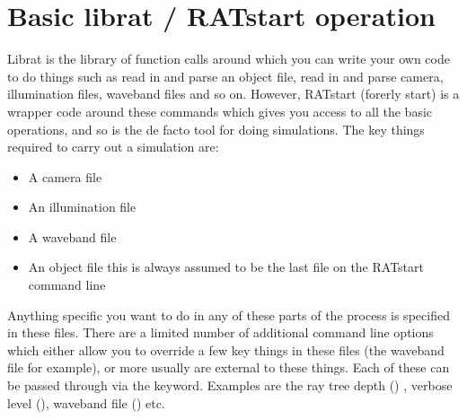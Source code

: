 \documentclass[letterpaper,10pt,english]{sphinxmanual}
\begin{document}
{
\begin{sphinxVerbatim}[commandchars=\\\{\}]
\llap{\color{nbsphinxin}[ ]:\,\hspace{\fboxrule}\hspace{\fboxsep}}
\end{sphinxVerbatim}
}

{
\begin{sphinxVerbatim}[commandchars=\\\{\}]
\llap{\color{nbsphinxin}[ ]:\,\hspace{\fboxrule}\hspace{\fboxsep}}
\end{sphinxVerbatim}
}


\chapter{Basic librat / RATstart operation}
\label{\detokenize{Chapter2:Basic-librat-/-RATstart-operation}}\label{\detokenize{Chapter2::doc}}
Librat is the library of function calls around which you can write your own code to do things such as read in and parse an object file, read in and parse camera, illumination files, waveband files and so on. However, RATstart (forerly start) is a wrapper code around these commands which gives you access to all the basic operations, and so is the de facto tool for doing simulations. The key things required to carry out a simulation are:
\begin{itemize}
\item {} 
A camera file

\item {} 
An illumination file

\item {} 
A waveband file

\item {} 
An object file \sphinxhyphen{} this is always assumed to be the last file on the RATstart command line

\end{itemize}

Anything specific you want to do in any of these parts of the process is specified in these files. There are a limited number of additional command line options which either allow you to override a few key things in these files (the waveband file for example), or more usually are external to these things. Each of these can be passed through via the  keyword. Examples are the ray tree depth () , verbose level (), waveband file () etc.
\end{document}
